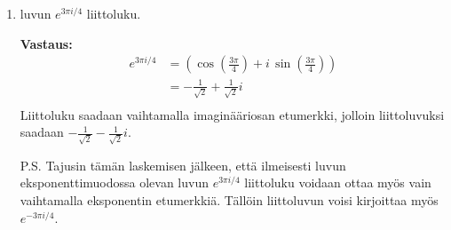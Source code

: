 \documentclass[a4paper,12pt]{article}
\begin{document}
\begin{enumerate}
\begin{enumerate}
\textbf{Vastaus:}
\begin{align*}
    (3e^{2\pi i/3})^4&=81e^{\frac{2\pi i}{3}\cdot 4}\\
    &=81e^{\frac{8\pi}{3}i}\\
    &=81e^{\frac{8\pi}{3}i}
\end{align*}

\item luvun $e^{3\pi i/4}$ liittoluku.

\textbf{Vastaus:}
\begin{align*}
    e^{3\pi i/4}&=\left(\cos\left(\frac{3\pi}{4}\right)+i\,\sin\left(\frac{3\pi}{4}\right)\right)\\
    &=-\frac{1}{\sqrt{2}}+\frac{1}{\sqrt{2}}i\\
\end{align*}
Liittoluku saadaan vaihtamalla imaginääriosan etumerkki, jolloin liittoluvuksi saadaan $ -\frac{1}{\sqrt{2}}-\frac{1}{\sqrt{2}}i$.

P.S. Tajusin tämän laskemisen jälkeen, että ilmeisesti luvun eksponenttimuodossa olevan luvun $e^{3\pi i/4}$ liittoluku voidaan ottaa myös vain vaihtamalla eksponentin etumerkkiä. Tällöin liittoluvun voisi kirjoittaa myös $e^{-3\pi i/4}$.


\end{enumerate}

\end{enumerate}
\end{document}
